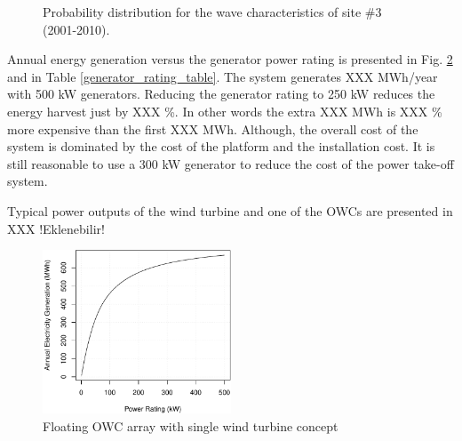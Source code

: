 \documentclass[twocolumn]{article}
\begin{document}
\begin{figure}[]
  \centering

    \caption{Probability distribution for the wave characteristics of site \#3 (2001-2010).} 
    \label{spain_site}
\end{figure}

Annual energy generation versus the generator power rating is presented in Fig. \ref{generator_rating} and in Table \ref{generator_rating_table}. The system generates XXX MWh/year with 500 kW generators. Reducing the generator rating to 250 kW reduces the energy harvest just by XXX \%. In other words the extra XXX MWh is XXX \% more expensive than the first XXX MWh. Although, the overall cost of the system is dominated by the cost of the platform and the installation cost. It is still reasonable to use a 300 kW generator to reduce the cost of the power take-off system.

Typical power outputs of the wind turbine and one of the OWCs are presented in XXX !Eklenebilir!

  \begin{figure}
    \centering
    \includegraphics[width=0.5\textwidth]{generator_rating}
    \caption{Floating OWC array with single wind turbine concept } 
    \label{generator_rating}
  \end{figure}
  
\end{document}
